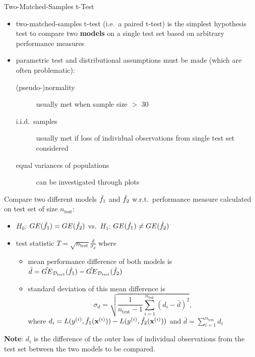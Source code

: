     \begin{frame}[c,allowframebreaks]{Two-Matched-Samples t-Test}

        \begin{itemize}
            \item two-matched-samples t-test (i.e.\ a paired t-test) is the simplest
                hypothesis test to compare two \textbf{models} on a single
                test set based on arbitrary performance measures
            \item parametric test and distributional assumptions must be made
                (which are often problematic):
                \begin{description}
                \item[(pseudo-)normality] usually met when sample size $>$ 30
                \item[i.i.d.\ samples] usually met if loss of individual observations from single test set considered
                \item[equal variances of populations] can be investigated through plots
                \end{description}
        \end{itemize}

    \framebreak

    Compare two different models $\hat{f}_1$ and $\hat{f}_2$ w.r.t.\ performance measure calculated on test set of size $n_{\text{test}}$:

    \begin{itemize}
    \item $H_0$: $GE(\hat{f}_{1}) = GE(\hat{f}_{2})$ vs.\ $H_1$: $GE(\hat{f}_{1}) \neq GE(\hat{f}_{2})$
    \item test statistic $T = \sqrt{n_{\text{test}}}
        \frac{\bar{d}}{\sigma_{d}}$ where
    \begin{itemize}
    \item mean performance difference of both models is
        $\bar{d} = \hat{GE}_{\mathcal{D}_{\text{test}}}(\hat{f}_{1}) - \hat{GE}_{\mathcal{D}_{\text{test}}}(\hat{f}_{2})$
    \item standard deviation of this mean difference is
    $$\sigma_{d} = \sqrt{\frac{1}{n_{\text{test}} - 1}\sum_{i=1}^{n_{\text{test}}} \left(d_i - \bar{d} \right)^2},$$
    where $d_i = L(y^{(i)}, \hat{f}_1 (\mathbf{x}^{(i)})) - L(y^{(i)}, \hat{f}_2 (\mathbf{x}^{(i)}))$ and $\bar{d} = \sum\limits_{i=1}^{n_{\text{test}}} d_i$
    \end{itemize}
    \end{itemize}

    \textbf{Note}: $d_i$ is the difference of the outer loss of individual observations from the test set between the two models to be compared.


\end{frame}
